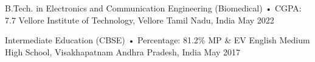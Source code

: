 
\begin{cventries}

\cventry
  {B.Tech. in Electronics and Communication Engineering (Biomedical) • CGPA: 7.7}%
  {Vellore Institute of Technology, Vellore}%
  {Tamil Nadu, India}%
  {May 2022}%
  {%
  }

\cventry
  {Intermediate Education (CBSE) • Percentage: 81.2\%}%
  {MP \& EV English Medium High School, Visakhapatnam}%
  {Andhra Pradesh, India}%
  {May 2017}%
  {%
  }

\end{cventries}

